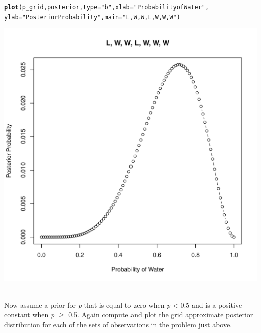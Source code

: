 \documentclass[12pt]{article}\usepackage[]{graphicx}\usepackage[]{color}
\makeatletter
\def\maxwidth{ %
  \ifdim\Gin@nat@width>\linewidth
    \linewidth
  \else
    \Gin@nat@width
  \fi
}
\newcommand{\hlstr}[1]{\textcolor[rgb]{0.192,0.494,0.8}{#1}}%
\newcommand{\hlstd}[1]{\textcolor[rgb]{0.345,0.345,0.345}{#1}}%
\newcommand{\hlkwc}[1]{\textcolor[rgb]{0.333,0.667,0.333}{#1}}%
\newcommand{\hlkwd}[1]{\textcolor[rgb]{0.737,0.353,0.396}{\textbf{#1}}}%
\newenvironment{kframe}{%
 \def\at@end@of@kframe{}%
 \ifinner\ifhmode%
  \def\at@end@of@kframe{\end{minipage}}%
  \begin{minipage}{\columnwidth}%
 \fi\fi%
 \def\FrameCommand##1{\hskip\@totalleftmargin \hskip-\fboxsep
 \colorbox{shadecolor}{##1}\hskip-\fboxsep
     \hskip-\linewidth \hskip-\@totalleftmargin \hskip\columnwidth}%
 \MakeFramed {\advance\hsize-\width
   \@totalleftmargin\z@ \linewidth\hsize
   \@setminipage}}%
 {\par\unskip\endMakeFramed%
 \at@end@of@kframe}
\newenvironment{knitrout}{}{} %
\newenvironment{problem}[2][Problem]{\begin{trivlist}
\item[\hskip \labelsep {\bfseries #1}\hskip \labelsep {\bfseries #2.}]}{\end{trivlist}}
\makeatother
\begin{document}
\begin{knitrout}
\begin{kframe}
\begin{alltt}
\hlkwd{plot}\hlstd{(p_grid, posterior,} \hlkwc{type} \hlstd{=} \hlstr{"b"}\hlstd{,} \hlkwc{xlab} \hlstd{=} \hlstr{"Probability of Water"}\hlstd{,}
     \hlkwc{ylab} \hlstd{=} \hlstr{"Posterior Probability"}\hlstd{,} \hlkwc{main} \hlstd{=} \hlstr{"L, W, W, L, W, W, W"}\hlstd{)}
\end{alltt}
\end{kframe}
\includegraphics[width=\maxwidth]{figure/unnamed-chunk-2-3} 

\end{knitrout}

\begin{problem}{2M2}
\text{}\\
Now assume a prior for \textit{p} that is equal to zero when \textit{p} < 0.5 and is a positive constant when \textit{p} $\geq$ 0.5. Again compute and plot the grid approximate posterior distribution for each of the sets of observations in the problem just above.
\end{problem}
\end{document}
